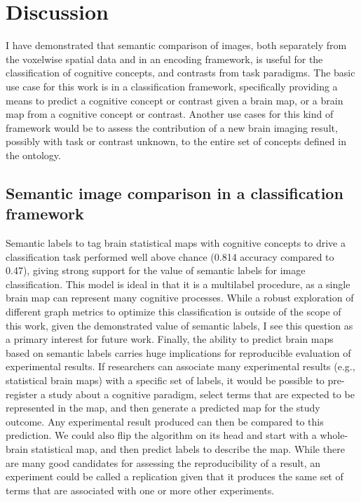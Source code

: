 \documentclass{report}
\begin{document}
\section{Discussion}

I have demonstrated that semantic comparison of images, both separately
from the voxelwise spatial data and in an encoding framework, is useful
for the classification of cognitive concepts, and contrasts from task
paradigms. The basic use case for this work is in a classification
framework, specifically providing a means to predict a cognitive concept
or contrast given a brain map, or a brain map from a cognitive concept
or contrast. Another use cases for this kind of framework would be to
assess the contribution of a new brain imaging result, possibly with
task or contrast unknown, to the entire set of concepts defined in the
ontology.

\subsection{Semantic image comparison in a classification framework}

Semantic labels to tag brain statistical maps with cognitive concepts to
drive a classification task performed well above chance (0.814 accuracy
compared to 0.47), giving strong support for the value of semantic
labels for image classification. This model is ideal in that it is a
multilabel procedure, as a single brain map can represent many cognitive
processes. While a robust exploration of different graph metrics to
optimize this classification is outside of the scope of this work, given
the demonstrated value of semantic labels, I see this question as a
primary interest for future work. Finally, the ability to predict brain maps based on semantic labels carries huge implications for reproducible evaluation of experimental results. If researchers can associate many experimental results (e.g., statistical brain maps) with a specific set of labels, it would be possible to pre-register a study about a cognitive paradigm, select terms that are expected to be represented in the map, and then generate a predicted map for the study outcome. Any experimental result produced can then be compared to this prediction. We could also flip the algorithm on its head and start with a whole-brain statistical map, and then predict labels to describe the map. While there are many good candidates for assessing the reproducibility of a result, an experiment could be called a replication given that it produces the same set of terms that are associated with one or more other experiments.
\end{document}
